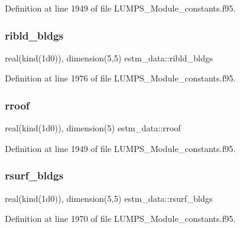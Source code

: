 Definition at line 1949 of file L\+U\+M\+P\+S\+\_\+\+Module\+\_\+constants.\+f95.

\mbox{\label{namespaceestm__data_a8ecb43f42e5bf6e0baa8109e38e010bd}} 
\subsubsection{\texorpdfstring{ribld\+\_\+bldgs}{ribld\_bldgs}}
{\footnotesize\ttfamily real(kind(1d0)), dimension(5,5) estm\+\_\+data\+::ribld\+\_\+bldgs}



Definition at line 1976 of file L\+U\+M\+P\+S\+\_\+\+Module\+\_\+constants.\+f95.

\mbox{\label{namespaceestm__data_aab36dbd44cebff7b2d6bf3c8c505eca9}} 
\subsubsection{\texorpdfstring{rroof}{rroof}}
{\footnotesize\ttfamily real(kind(1d0)), dimension(5) estm\+\_\+data\+::rroof}



Definition at line 1949 of file L\+U\+M\+P\+S\+\_\+\+Module\+\_\+constants.\+f95.

\mbox{\label{namespaceestm__data_ae021e526e3850da2a5683c8834e829e1}} 
\subsubsection{\texorpdfstring{rsurf\+\_\+bldgs}{rsurf\_bldgs}}
{\footnotesize\ttfamily real(kind(1d0)), dimension(5,5) estm\+\_\+data\+::rsurf\+\_\+bldgs}



Definition at line 1970 of file L\+U\+M\+P\+S\+\_\+\+Module\+\_\+constants.\+f95.

\mbox{\label{namespaceestm__data_a263d4ea8134834255e133ba3ba191efc}} 
